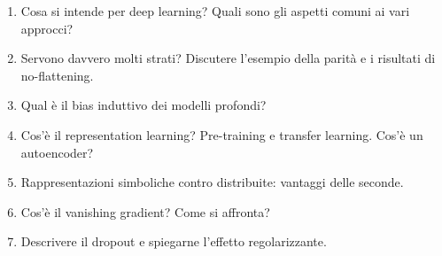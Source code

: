 \begin{domande}
\begin{enumerate}
  \item Cosa si intende per deep learning? Quali sono gli aspetti comuni ai vari approcci?
  \item Servono davvero molti strati? Discutere l'esempio della parità e i risultati di no-flattening.
  \item Qual è il bias induttivo dei modelli profondi?
  \item Cos'è il representation learning? Pre-training e transfer learning. Cos'è un autoencoder?
  \item Rappresentazioni simboliche contro distribuite: vantaggi delle seconde.
  \item Cos'è il vanishing gradient? Come si affronta?
  \item Descrivere il dropout e spiegarne l'effetto regolarizzante.
\end{enumerate}
\end{domande}
